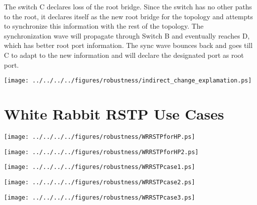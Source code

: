 The switch C declares loss of the root bridge. Since the switch has no other 
paths to the root, it declares
itself as the new root bridge for the topology and attempts to synchronize  this
information with the rest of 
the topology. The synchronization wave will propagate through Switch B and 
eventually reaches D, which has better root port information. The sync wave
bounces back and goes till C to adapt to the new information and will declare
the designated port as root port.

\begin{center}
        \texttt{[image: ../../../../figures/robustness/indirect\_change\_explamation.ps]}
        \label{fig:indirect_change}
\end{center}

\section{White Rabbit RSTP Use Cases}

\begin{center}
	\texttt{[image: ../../../../figures/robustness/WRRSTPforHP.ps]}
	\label{fig:WRRSTPforHP}
\end{center}

\begin{center}
	\texttt{[image: ../../../../figures/robustness/WRRSTPforHP2.ps]}
	\label{fig:WRRSTPforHP2}
\end{center}

\begin{center}
	\texttt{[image: ../../../../figures/robustness/WRRSTPcase1.ps]}
	\label{fig:WRRSTPcase1}
\end{center}

\begin{center}
	\texttt{[image: ../../../../figures/robustness/WRRSTPcase2.ps]}
	\label{fig:WRRSTPcase2}
\end{center}
\begin{center}
	\texttt{[image: ../../../../figures/robustness/WRRSTPcase3.ps]}
	\label{fig:WRRSTPcase3}
\end{center}

